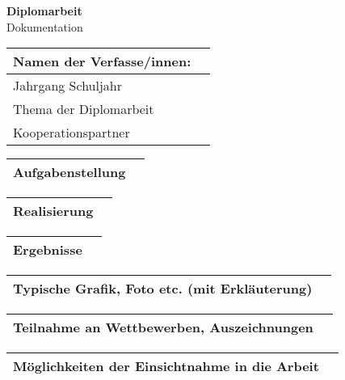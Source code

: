 \documentclass[letterpaper,10pt]{article}
\begin{document}
\pagebreak


\begin{center}
    \textbf{\Huge{Diplomarbeit}} \\
    \huge{Dokumentation}
\end{center}


\begin{tabular*}{\textwidth}{|l | l|}
    \hline
    Namen der Verfasse/innen: & \\
    \hline
    Jahrgang Schuljahr & \\
    \hline
    Thema der Diplomarbeit & \\
    \hline
    Kooperationspartner \\
    \hline
\end{tabular*}


\begin{tabular*}{\textwidth}{|l | l|}
    \hline
    Aufgabenstellung & \\

    \hline
\end{tabular*}

\begin{tabular*}{\textwidth}{|l | l|}
    \hline
    Realisierung & \\

    \hline
\end{tabular*}


\begin{tabular*}{\textwidth}{|l | l|}
    \hline
    Ergebnisse & \\

    \hline
\end{tabular*}


\begin{tabular*}{\textwidth}{|l | l|}
    \hline
    Typische Grafik, Foto etc. (mit Erkläuterung) & \\

    \hline
\end{tabular*}


\begin{tabular*}{\textwidth}{|l | l|}
    \hline
    Teilnahme an Wettbewerben, Auszeichnungen & \\

    \hline
\end{tabular*}


\begin{tabular*}{\textwidth}{|l | l|}
    \hline
    Möglichkeiten der Einsichtnahme in die Arbeit & \\

    \hline
\end{tabular*}
\end{document}

